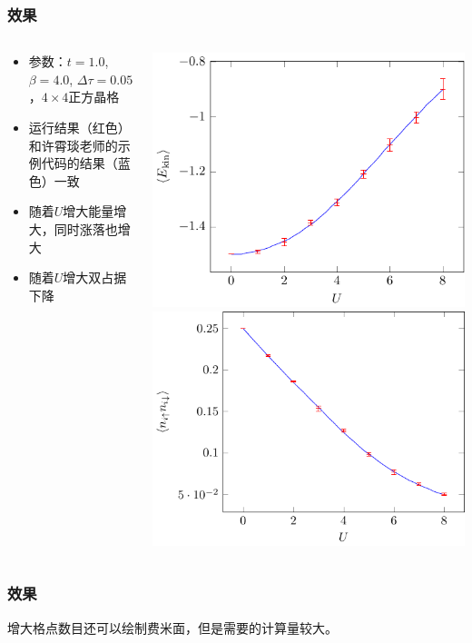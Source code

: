 \documentclass[UTF8]{ctexbeamer}
\begin{document}
\begin{frame}
\frametitle{效果}

\begin{columns}

    \begin{column}{0.5\textwidth}
        \begin{itemize}
            \item 参数：$t=1.0$, $\beta = 4.0$, $\Delta \tau = 0.05$，$4 \times 4$正方晶格
            \item 运行结果（红色）和许霄琰老师的示例代码的结果（蓝色）一致
            \item 随着$U$增大能量增大，同时涨落也增大
            \item 随着$U$增大双占据下降
        \end{itemize}
    \end{column}

    \begin{column}{0.4\textwidth}
        \includegraphics[width=\textwidth]{T_compare.pdf}
        \includegraphics[width=\textwidth]{double_occ_compare.pdf}
    \end{column}
\end{columns}  

\end{frame}

\begin{frame}
    \frametitle{效果}

    增大格点数目还可以绘制费米面，但是需要的计算量较大。

\end{frame}
\end{document}
